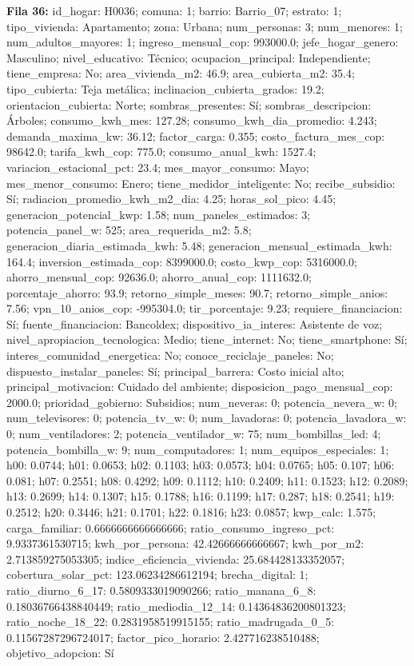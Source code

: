 {\footnotesize\textbf{Fila 36:} id\_hogar: H0036; comuna: 1; barrio: Barrio\_07; estrato: 1; tipo\_vivienda: Apartamento; zona: Urbana; num\_personas: 3; num\_menores: 1; num\_adultos\_mayores: 1; ingreso\_mensual\_cop: 993000.0; jefe\_hogar\_genero: Masculino; nivel\_educativo: Técnico; ocupacion\_principal: Independiente; tiene\_empresa: No; area\_vivienda\_m2: 46.9; area\_cubierta\_m2: 35.4; tipo\_cubierta: Teja metálica; inclinacion\_cubierta\_grados: 19.2; orientacion\_cubierta: Norte; sombras\_presentes: Sí; sombras\_descripcion: Árboles; consumo\_kwh\_mes: 127.28; consumo\_kwh\_dia\_promedio: 4.243; demanda\_maxima\_kw: 36.12; factor\_carga: 0.355; costo\_factura\_mes\_cop: 98642.0; tarifa\_kwh\_cop: 775.0; consumo\_anual\_kwh: 1527.4; variacion\_estacional\_pct: 23.4; mes\_mayor\_consumo: Mayo; mes\_menor\_consumo: Enero; tiene\_medidor\_inteligente: No; recibe\_subsidio: Sí; radiacion\_promedio\_kwh\_m2\_dia: 4.25; horas\_sol\_pico: 4.45; generacion\_potencial\_kwp: 1.58; num\_paneles\_estimados: 3; potencia\_panel\_w: 525; area\_requerida\_m2: 5.8; generacion\_diaria\_estimada\_kwh: 5.48; generacion\_mensual\_estimada\_kwh: 164.4; inversion\_estimada\_cop: 8399000.0; costo\_kwp\_cop: 5316000.0; ahorro\_mensual\_cop: 92636.0; ahorro\_anual\_cop: 1111632.0; porcentaje\_ahorro: 93.9; retorno\_simple\_meses: 90.7; retorno\_simple\_anios: 7.56; vpn\_10\_anios\_cop: -995304.0; tir\_porcentaje: 9.23; requiere\_financiacion: Sí; fuente\_financiacion: Bancoldex; dispositivo\_ia\_interes: Asistente de voz; nivel\_apropiacion\_tecnologica: Medio; tiene\_internet: No; tiene\_smartphone: Sí; interes\_comunidad\_energetica: No; conoce\_reciclaje\_paneles: No; dispuesto\_instalar\_paneles: Sí; principal\_barrera: Costo inicial alto; principal\_motivacion: Cuidado del ambiente; disposicion\_pago\_mensual\_cop: 2000.0; prioridad\_gobierno: Subsidios; num\_neveras: 0; potencia\_nevera\_w: 0; num\_televisores: 0; potencia\_tv\_w: 0; num\_lavadoras: 0; potencia\_lavadora\_w: 0; num\_ventiladores: 2; potencia\_ventilador\_w: 75; num\_bombillas\_led: 4; potencia\_bombilla\_w: 9; num\_computadores: 1; num\_equipos\_especiales: 1; h00: 0.0744; h01: 0.0653; h02: 0.1103; h03: 0.0573; h04: 0.0765; h05: 0.107; h06: 0.081; h07: 0.2551; h08: 0.4292; h09: 0.1112; h10: 0.2409; h11: 0.1523; h12: 0.2089; h13: 0.2699; h14: 0.1307; h15: 0.1788; h16: 0.1199; h17: 0.287; h18: 0.2541; h19: 0.2512; h20: 0.3446; h21: 0.1701; h22: 0.1816; h23: 0.0857; kwp\_calc: 1.575; carga\_familiar: 0.6666666666666666; ratio\_consumo\_ingreso\_pct: 9.9337361530715; kwh\_por\_persona: 42.42666666666667; kwh\_por\_m2: 2.713859275053305; indice\_eficiencia\_vivienda: 25.684428133352057; cobertura\_solar\_pct: 123.06234286612194; brecha\_digital: 1; ratio\_diurno\_6\_17: 0.5809333019090266; ratio\_manana\_6\_8: 0.18036766438840449; ratio\_mediodia\_12\_14: 0.14364836200801323; ratio\_noche\_18\_22: 0.2831958519915155; ratio\_madrugada\_0\_5: 0.11567287296724017; factor\_pico\_horario: 2.427716238510488; objetivo\_adopcion: Sí\par}
